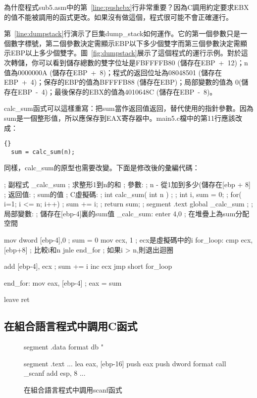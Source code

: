 為什麼程式{\code sub5.asm}中的第~\ref{line:pushebx}行非常重要？因為C調用約定要求EBX的值不能被調用的函式更改。如果沒有做這個，程式很可能不會正確運行。

第~\ref{line:dumpstack}行演示了巨集{\code dump\_stack}如何運作。它的第一個參數只是一個數字標號，第二個參數決定需顯示EBP以下多少個雙字而第三個參數決定需顯示EBP以上多少個雙字。圖~\ref{fig:dumpstack}展示了這個程式的運行示例。對於這次轉儲，你可以看到儲存總數的雙字位址是FBFFFFB80 (儲存在EBP~+~12)；n值為0000000A
(儲存在EBP~+~8)；程式的返回位址為08048501 (儲存在EBP~+~4)；保存的EBP的值為BFFFFB88 (儲存在EBP)；局部變數的值為
0(儲存在EBP~-~4)；最後保存的EBX的值為4010648C (儲存在EBP~-~8)。

{\code calc\_sum}函式可以這樣重寫：把sum當作返回值返回，替代使用的指針參數。因為sum是一個整形值，所以應保存到EAX寄存器中。{\code main5.c}檔中的第11行應該改成：
\begin{lstlisting}[stepnumber=0]{}
  sum = calc_sum(n);
\end{lstlisting}
同樣，{\code calc\_sum}的原型也需要改變。下面是修改後的彙編代碼：
\begin{AsmCodeListing}[label=sub6.asm]
; 副程式 _calc_sum
; 求整形1到n的和 ; 參數:
;   n - 從1加到多少(儲存在[ebp + 8]
; 返回值:
;   sum的值
; C虛擬碼:
; int calc_sum( int n )
; {
;   int i, sum = 0;
;   for( i=1; i <= n; i++)
;     sum += i;
;   return sum;
; }
segment .text
        global  _calc_sum
;
; 局部變數:
;   儲存在[ebp-4]裏的sum值
_calc_sum:
        enter   4,0               ; 在堆疊上為sum分配空間

        mov     dword [ebp-4],0   ; sum = 0
        mov     ecx, 1            ; ecx是虛擬碼中的i
for_loop:
        cmp     ecx, [ebp+8]      ; 比較i和n
        jnle    end_for           ; 如果i > n,則退出迴圈

        add     [ebp-4], ecx      ; sum += i
        inc     ecx
        jmp     short for_loop

end_for:
        mov     eax, [ebp-4]      ; eax = sum

        leave
        ret
\end{AsmCodeListing}

\subsection{在組合語言程式中調用C函式}

\begin{figure}[t]
\begin{AsmCodeListing}[frame=single]
segment .data
format       db "%

segment .text
...
      lea    eax, [ebp-16]
      push   eax
      push   dword format
      call   _scanf
      add    esp, 8
...
\end{AsmCodeListing}
\caption{在組合語言程式中調用{\code scanf}函式\label{fig:scanf}}
\end{figure}

